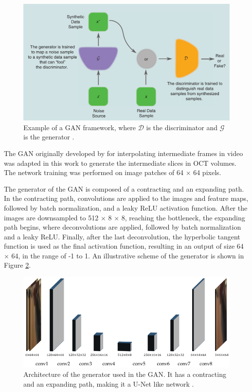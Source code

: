 \begin{figure}[!ht]
	\centering
	\includegraphics[width=0.7\linewidth]{figures/GANFramework}
	\caption{Example of a GAN framework, where $\mathcal{D}$ is the discriminator and $\mathcal{G}$ is the generator \parencite{Creswell2018}.}
	\label{fig:GANFramework}
\end{figure}

The GAN originally developed by \textcite{Tran2020} for interpolating intermediate frames in video was adapted in this work to generate the intermediate slices in OCT volumes. The network training was performed on image patches of 64 $\times$ 64 pixels.
\par
The generator of the GAN is composed of a contracting and an expanding path. In the contracting path, convolutions are applied to the images and feature maps, followed by batch normalization, and a leaky ReLU activation function. After the images are downsampled to 512 $\times$ 8 $\times$ 8, reaching the bottleneck, the expanding path begins, where deconvolutions are applied, followed by batch normalization and a leaky ReLU. Finally, after the last deconvolution, the hyperbolic tangent function is used as the final activation function, resulting in an output of size 64 $\times$ 64, in the range of -1 to 1. An illustrative scheme of the generator is shown in Figure \ref{fig:GeneratorArchitecture}.

\begin{figure}
	\centering
	\includegraphics[width=1.0\linewidth]{figures/GeneratorArchitecture}
	\caption{Architecture of the generator used in the GAN. It has a contracting and an expanding path, making it a U-Net like network \parencite{Tran2020}.}
	\label{fig:GeneratorArchitecture}
\end{figure}

